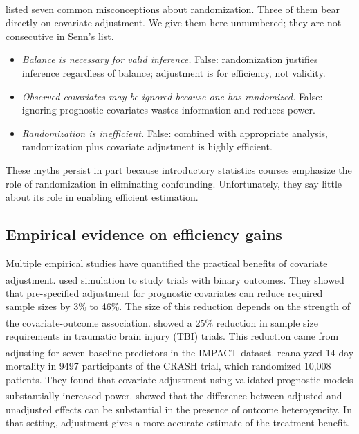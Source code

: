 \documentclass[
  11pt,
]{article}
\providecommand{\tightlist}{%
  \setlength{\itemsep}{0pt}\setlength{\parskip}{0pt}}
\begin{document}
\textsuperscript{} listed seven common misconceptions
about randomization. Three of them bear directly on
covariate adjustment. We give them here unnumbered;
they are not consecutive in Senn's list.

\begin{itemize}
\tightlist
\item
  \emph{Balance is necessary for valid inference.} False:
  randomization justifies inference regardless of
  balance; adjustment is for efficiency, not validity.
\item
  \emph{Observed covariates may be ignored because one
  has randomized.} False: ignoring prognostic
  covariates wastes information and reduces power.
\item
  \emph{Randomization is inefficient.} False: combined
  with appropriate analysis, randomization plus
  covariate adjustment is highly efficient.
\end{itemize}

These myths persist in part because introductory
statistics courses emphasize the role of randomization
in eliminating confounding. Unfortunately, they say
little about its role in enabling efficient estimation.

\subsection{Empirical evidence on efficiency gains}\label{empirical-evidence-on-efficiency-gains}

Multiple empirical studies have quantified the
practical benefits of covariate adjustment.\textsuperscript{} used simulation to study trials
with binary outcomes. They showed that pre-specified
adjustment for prognostic covariates can reduce
required sample sizes by 3\% to 46\%. The size of this
reduction depends on the strength of the
covariate-outcome association.\textsuperscript{}
showed a 25\% reduction in sample size requirements in
traumatic brain injury (TBI) trials. This reduction
came from adjusting for seven baseline predictors in
the IMPACT dataset.\textsuperscript{} reanalyzed
14-day mortality in 9497 participants of the CRASH
trial, which randomized 10,008 patients. They found
that covariate adjustment using validated prognostic
models substantially increased power.\textsuperscript{} showed that the difference
between adjusted and unadjusted effects can be
substantial in the presence of outcome heterogeneity.
In that setting, adjustment gives a more accurate
estimate of the treatment benefit.
\end{document}
